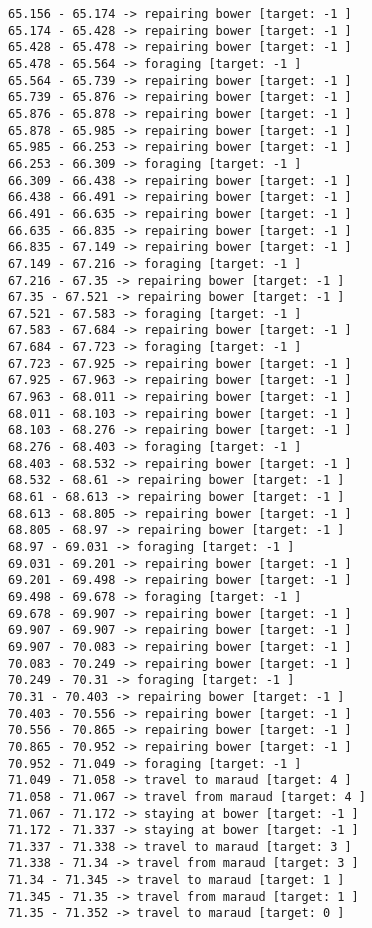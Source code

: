 \documentclass[11pt]{article}
\begin{document}
\begin{Verbatim}[commandchars=\\\{\}]
65.156 - 65.174 -> repairing bower [target: -1 ]
65.174 - 65.428 -> repairing bower [target: -1 ]
65.428 - 65.478 -> repairing bower [target: -1 ]
65.478 - 65.564 -> foraging [target: -1 ]
65.564 - 65.739 -> repairing bower [target: -1 ]
65.739 - 65.876 -> repairing bower [target: -1 ]
65.876 - 65.878 -> repairing bower [target: -1 ]
65.878 - 65.985 -> repairing bower [target: -1 ]
65.985 - 66.253 -> repairing bower [target: -1 ]
66.253 - 66.309 -> foraging [target: -1 ]
66.309 - 66.438 -> repairing bower [target: -1 ]
66.438 - 66.491 -> repairing bower [target: -1 ]
66.491 - 66.635 -> repairing bower [target: -1 ]
66.635 - 66.835 -> repairing bower [target: -1 ]
66.835 - 67.149 -> repairing bower [target: -1 ]
67.149 - 67.216 -> foraging [target: -1 ]
67.216 - 67.35 -> repairing bower [target: -1 ]
67.35 - 67.521 -> repairing bower [target: -1 ]
67.521 - 67.583 -> foraging [target: -1 ]
67.583 - 67.684 -> repairing bower [target: -1 ]
67.684 - 67.723 -> foraging [target: -1 ]
67.723 - 67.925 -> repairing bower [target: -1 ]
67.925 - 67.963 -> repairing bower [target: -1 ]
67.963 - 68.011 -> repairing bower [target: -1 ]
68.011 - 68.103 -> repairing bower [target: -1 ]
68.103 - 68.276 -> repairing bower [target: -1 ]
68.276 - 68.403 -> foraging [target: -1 ]
68.403 - 68.532 -> repairing bower [target: -1 ]
68.532 - 68.61 -> repairing bower [target: -1 ]
68.61 - 68.613 -> repairing bower [target: -1 ]
68.613 - 68.805 -> repairing bower [target: -1 ]
68.805 - 68.97 -> repairing bower [target: -1 ]
68.97 - 69.031 -> foraging [target: -1 ]
69.031 - 69.201 -> repairing bower [target: -1 ]
69.201 - 69.498 -> repairing bower [target: -1 ]
69.498 - 69.678 -> foraging [target: -1 ]
69.678 - 69.907 -> repairing bower [target: -1 ]
69.907 - 69.907 -> repairing bower [target: -1 ]
69.907 - 70.083 -> repairing bower [target: -1 ]
70.083 - 70.249 -> repairing bower [target: -1 ]
70.249 - 70.31 -> foraging [target: -1 ]
70.31 - 70.403 -> repairing bower [target: -1 ]
70.403 - 70.556 -> repairing bower [target: -1 ]
70.556 - 70.865 -> repairing bower [target: -1 ]
70.865 - 70.952 -> repairing bower [target: -1 ]
70.952 - 71.049 -> foraging [target: -1 ]
71.049 - 71.058 -> travel to maraud [target: 4 ]
71.058 - 71.067 -> travel from maraud [target: 4 ]
71.067 - 71.172 -> staying at bower [target: -1 ]
71.172 - 71.337 -> staying at bower [target: -1 ]
71.337 - 71.338 -> travel to maraud [target: 3 ]
71.338 - 71.34 -> travel from maraud [target: 3 ]
71.34 - 71.345 -> travel to maraud [target: 1 ]
71.345 - 71.35 -> travel from maraud [target: 1 ]
71.35 - 71.352 -> travel to maraud [target: 0 ]

\end{Verbatim}
\end{document}
